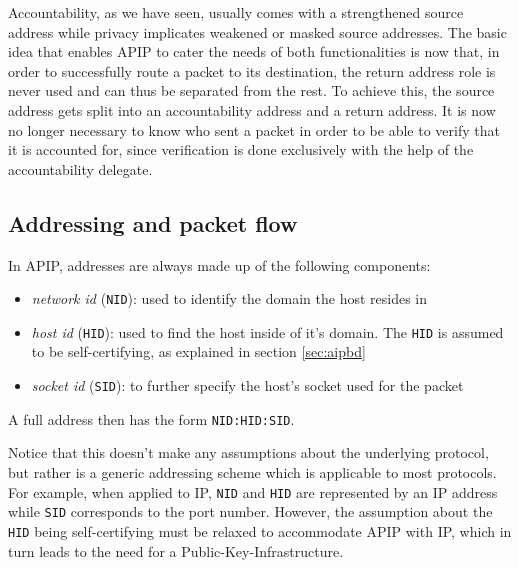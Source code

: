 \documentclass{acm_proc_article-sp}
\begin{document}
Accountability, as we have seen, usually comes with a strengthened source address while privacy implicates weakened or masked source addresses. The basic idea that enables APIP to cater the needs of both functionalities is now that, in order to successfully route a packet to its destination, the return address role is never used and can thus be separated from the rest. To achieve this, the source address gets split into an accountability address and a return address. It is now no longer necessary to know who sent a packet in order to be able to verify that it is accounted for, since verification is done exclusively with the help of the accountability delegate.

\subsection{Addressing and packet flow}

In APIP, addresses are always made up of the following components:

\begin{itemize}
\item \emph{network id} (\texttt{NID}): used to identify the domain the host resides in
\item \emph{host id} (\texttt{HID}): used to find the host inside of it's domain. The \texttt{HID} is assumed to be self-certifying, as explained in section \ref{sec:aipbd}
\item \emph{socket id} (\texttt{SID}): to further specify the host's socket used for the packet
\end{itemize}

A full address then has the form \texttt{NID:HID:SID}.

Notice that this doesn't make any assumptions about the underlying protocol, but rather is a generic addressing scheme which is applicable to most protocols. For example, when applied to IP, \texttt{NID} and \texttt{HID} are represented by an IP address while \texttt{SID} corresponds to the port number. However, the assumption about the \texttt{HID} being self-certifying must be relaxed to accommodate APIP with IP, which in turn leads to the need for a Public-Key-Infrastructure. 
\end{document}
